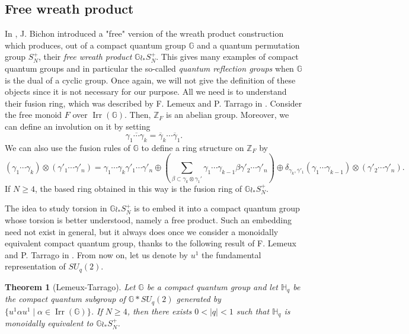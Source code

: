 \documentclass[a4paper, 11pt]{amsart}
\theoremstyle{plain}
\newtheorem{thm}{Theorem}[section]
\theoremstyle{definition}
\theoremstyle{remark}
\DeclareMathOperator{\Irr}{Irr}
\newcommand{\G}{\mathbb{G}}
\newcommand{\HH}{\mathbb{H}}
\newcommand{\Z}{\mathbb{Z}}
\begin{document}
\subsection{Free wreath product}\label{subsec:wreathproduct}

In \cite{bichon2004free}, J. Bichon introduced a "free" version of the wreath product construction which produces, out of a compact quantum group $\G$ and a quantum permutation group $S_{N}^{+}$, their \emph{free wreath product} $\G\wr_{\ast}S_{N}^{+}$. This gives many examples of compact quantum groups and in particular the so-called \emph{quantum reflection groups} when $\G$ is the dual of a cyclic group. Once again, we will not give the definition of these objects since it is not necessary for our purpose. All we need is to understand their fusion ring, which was described by F. Lemeux and P. Tarrago in \cite{lemeux2014free}. Consider the free monoid $F$ over $\Irr(\G)$. Then, $\Z_{F}$ is an abelian group. Moreover, we can define an involution on it by setting
\begin{equation*}
\overline{\gamma_{1}\cdots\gamma_{k}} = \overline{\gamma}_{k}\cdots\overline{\gamma}_{1}.
\end{equation*}
We can also use the fusion rules of $\G$ to define a ring structure on $\Z_{F}$ by
\begin{equation*}
(\gamma_{1}\cdots\gamma_{k})\otimes (\gamma'_{1}\cdots\gamma'_{n}) = \gamma_{1}\cdots\gamma_{k}\gamma'_{1}\cdots\gamma'_{n}\oplus \left(\sum_{\beta\subset\gamma_{k}\otimes\gamma_{1}'}\gamma_{1}\cdots\gamma_{k-1}\beta\gamma'_{2}\cdots\gamma'_{n}\right) \oplus \delta_{\gamma_{k}, \overline{\gamma}'_{1}}(\gamma_{1}\cdots\gamma_{k-1})\otimes (\gamma'_{2}\cdots\gamma'_{n}).
\end{equation*}
If $N\geqslant 4$, the based ring obtained in this way is the fusion ring of $\G\wr_{\ast}S_{N}^{+}$.

The idea to study torsion in $\G\wr_{\ast}S_{N}^{+}$ is to embed it into a compact quantum group whose torsion is better understood, namely a free product. Such an embedding need not exist in general, but it always does once we consider a monoidally equivalent compact quantum group, thanks to the following result of F. Lemeux and P. Tarrago in \cite{lemeux2014free}. From now on, let us denote by $u^{1}$ the fundamental representation of $SU_{q}(2)$.

\begin{thm}[Lemeux-Tarrago]\label{thm:lemeuxtarrago}
Let $\G$ be a compact quantum group and let $\HH_{q}$ be the compact quantum subgroup of $\G\ast SU_{q}(2)$ generated by $\{u^{1}\alpha u^{1}\mid \alpha\in \Irr(\G)\}$. If $N\geqslant 4$, then there exists $0< \vert q\vert < 1$ such that $\HH_{q}$ is monoidally equivalent to $\G\wr_{\ast}S_{N}^{+}$.
\end{thm}
\end{document}
